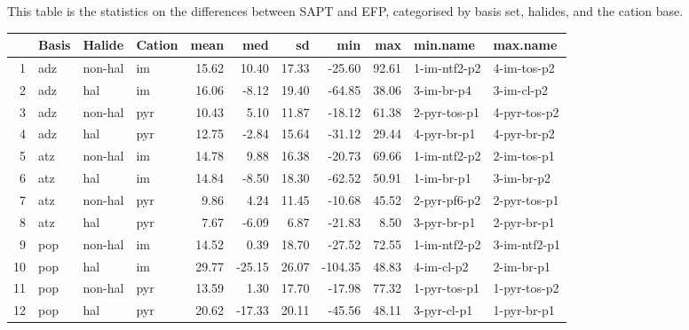 \documentclass[a4paper]{article}
\begin{document}
\begin{landscape}

This table is the statistics on the differences between SAPT and EFP, categorised by basis set, halides, and the cation base.

\begin{table}[ht]
\centering
\begin{tabular}{rlllrrrrrll}
  \hline
 & Basis & Halide & Cation & mean & med & sd & min & max & min.name & max.name \\ 
  \hline
1 & adz & non-hal & im & 15.62 & 10.40 & 17.33 & -25.60 & 92.61 & 1-im-ntf2-p2 & 4-im-tos-p2 \\ 
  2 & adz & hal & im & 16.06 & -8.12 & 19.40 & -64.85 & 38.06 & 3-im-br-p4 & 3-im-cl-p2 \\ 
  3 & adz & non-hal & pyr & 10.43 & 5.10 & 11.87 & -18.12 & 61.38 & 2-pyr-tos-p1 & 4-pyr-tos-p2 \\ 
  4 & adz & hal & pyr & 12.75 & -2.84 & 15.64 & -31.12 & 29.44 & 4-pyr-br-p1 & 4-pyr-br-p2 \\ \hline
  5 & atz & non-hal & im & 14.78 & 9.88 & 16.38 & -20.73 & 69.66 & 1-im-ntf2-p2 & 2-im-tos-p1 \\ 
  6 & atz & hal & im & 14.84 & -8.50 & 18.30 & -62.52 & 50.91 & 1-im-br-p1 & 3-im-br-p2 \\ 
  7 & atz & non-hal & pyr & 9.86 & 4.24 & 11.45 & -10.68 & 45.52 & 2-pyr-pf6-p2 & 2-pyr-tos-p1 \\ 
  8 & atz & hal & pyr & 7.67 & -6.09 & 6.87 & -21.83 & 8.50 & 3-pyr-br-p1 & 2-pyr-br-p1 \\ \hline
  9 & pop & non-hal & im & 14.52 & 0.39 & 18.70 & -27.52 & 72.55 & 1-im-ntf2-p2 & 3-im-ntf2-p1 \\ 
  10 & pop & hal & im & 29.77 & -25.15 & 26.07 & -104.35 & 48.83 & 4-im-cl-p2 & 2-im-br-p1 \\ 
  11 & pop & non-hal & pyr & 13.59 & 1.30 & 17.70 & -17.98 & 77.32 & 1-pyr-tos-p1 & 1-pyr-tos-p2 \\ 
  12 & pop & hal & pyr & 20.62 & -17.33 & 20.11 & -45.56 & 48.11 & 3-pyr-cl-p1 & 1-pyr-br-p1 \\ 
   \hline
\end{tabular}
\end{table}



\end{landscape}
\end{document}
